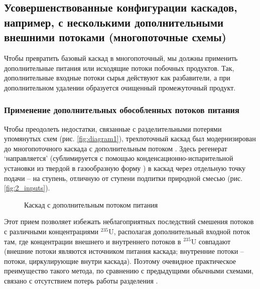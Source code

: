 \subsection{Усовершенствованные конфигурации каскадов, например, с несколькими дополнительными внешними потоками (многопоточные схемы)}
Чтобы превратить базовый каскад в многопоточный, мы должны применить дополнительные питания или исходящие потоки побочных продуктов. Так, дополнительные входные потоки сырья действуют как разбавители, а при дополнительном удалении образуется очищенный промежуточный продукт.

\subsubsection{Применение дополнительных обособленных потоков питания}
Чтобы преодолеть недостатки, связанные с разделительными потерями упомянутых схем (рис. \ref{fig:diagram1}), трехпоточный каскад был модернизирован до многопоточного каскада с дополнительным потоком \cite{smirnovKaskadnyeShemyZadachah2012}. Здесь регенерат `направляется' (сублимируется с помощью конденсационно-испарительной установки из твердой в газообразную форму \cite{orlovDesublimationPurificationTransporting2017}) в каскад через отдельную точку подачи -- на ступень, отличную от ступени подпитки природной смесью (рис. \ref{fig:2_inputs}).
\begin{figure}[ht]
  \caption{Каскад с дополнительным потоком питания}
\end{figure}
Этот прием позволяет избежать неблагоприятных последствий смешения потоков с различными концентрациями $^{235}$U, располагая дополнительный входной поток там, где концентрации внешнего и внутреннего потоков в $^{235}$U совпадают (внешние потоки являются источником питания каскада; внутренние потоки -- потоки, циркулирующие внутри каскада). Поэтому очевидное практическое преимущество такого метода, по сравнению с предыдущими обычными схемами, связано с отсутствием потерь работы разделения \cite{smirnovKaskadnyeShemyZadachah2012, sulaberidzeQuasiidealCascadesAdditional2006}.

